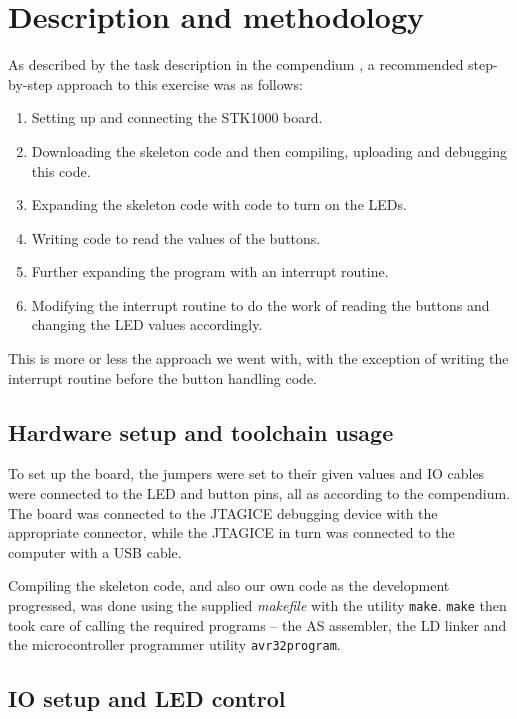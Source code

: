 \section{Description and methodology}

As described by the task description in the compendium \cite{comp}, a
recommended step-by-step approach to this exercise was as follows:

\begin{enumerate}
    \item Setting up and connecting the STK1000 board.
    \item Downloading the skeleton code and then compiling, uploading
    and debugging this code.
    \item Expanding the skeleton code with code to turn on the LEDs.
    \item Writing code to read the values of the buttons.
    \item Further expanding the program with an interrupt routine.
    \item Modifying the interrupt routine to do the work of reading the
    buttons and changing the LED values accordingly.
\end{enumerate}

This is more or less the approach we went with, with the exception of
writing the interrupt routine before the button handling code.

\subsection{Hardware setup and toolchain usage}

To set up the board, the jumpers were set to their given values and IO
cables were connected to the LED and button pins, all as according to
the compendium. The board was connected to the JTAGICE debugging device
with the appropriate connector, while the JTAGICE in turn was connected
to the computer with a USB cable.

Compiling the skeleton code, and also our own code as the development
progressed, was done using the supplied \emph{makefile} with the
utility \texttt{make}. \texttt{make} then took care of calling the
required programs -- the AS assembler, the LD linker and the
microcontroller programmer utility \texttt{avr32program}.

\subsection{IO setup and LED control}

